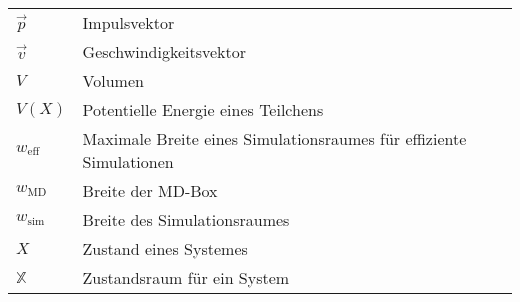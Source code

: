 \begin{longtable}{ll}
$\vec p$             & Impulsvektor                                                        \\
$\vec v$             & Geschwindigkeitsvektor                                              \\
$V$                  & Volumen                                                             \\
$V(X)$               & Potentielle Energie eines Teilchens                                 \\
$w_\text{eff}$       & Maximale Breite eines Simulationsraumes für effiziente Simulationen \\
$w_\text{MD}$        & Breite der MD-Box                                                   \\
$w_\text{sim}$       & Breite des Simulationsraumes                                        \\
$X$                  & Zustand eines Systemes                                              \\
$\mathbb{X}$         & Zustandsraum für ein System                                         \\
\end{longtable}

